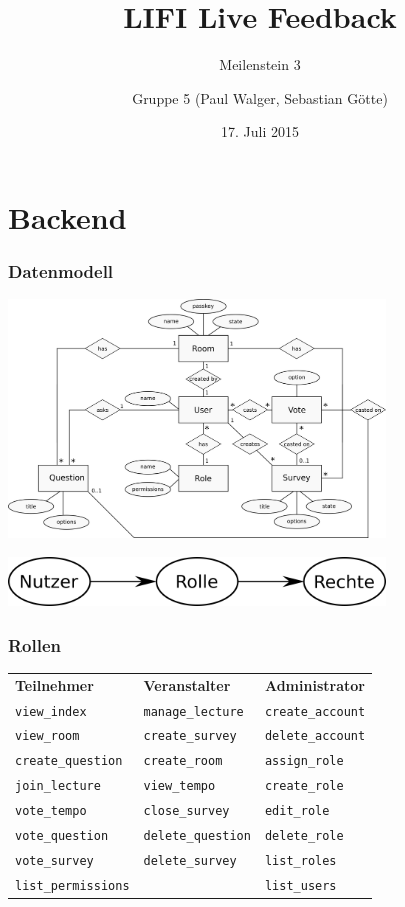 \documentclass{beamer}
\title{LIFI Live Feedback}
\subtitle{Meilenstein 3}
\author{Gruppe 5 (Paul Walger, Sebastian Götte)}
\institute{TU Berlin}
\date{17. Juli 2015}
\begin{document}
\frame{\titlepage}

\section{Backend}
\begin{frame}
    \frametitle{Datenmodell}
    \begin{center}
        \includegraphics[width=10cm]{../MS1/diagrams/er/er_diagram.png}
    \end{center}
\end{frame}
\begin{frame}
    \begin{center}
        \includegraphics[width=10cm]{diagrams/roles-1.png}
    \end{center}
\end{frame}
\begin{frame}
    \frametitle{Rollen}
    \begin{tabular}{lll}
        \textbf{Teilnehmer}&\textbf{Veranstalter}&\textbf{Administrator}\\
        \texttt{view\_index}&       \texttt{manage\_lecture}&  \texttt{create\_account}\\
        \texttt{view\_room}&        \texttt{create\_survey}&   \texttt{delete\_account}\\
        \texttt{create\_question}&  \texttt{create\_room}&     \texttt{assign\_role}\\
        \texttt{join\_lecture}&     \texttt{view\_tempo}&      \texttt{create\_role}\\
        \texttt{vote\_tempo}&       \texttt{close\_survey}&    \texttt{edit\_role}\\
        \texttt{vote\_question}&    \texttt{delete\_question}& \texttt{delete\_role}\\
        \texttt{vote\_survey}&      \texttt{delete\_survey}&   \texttt{list\_roles}\\
        \texttt{list\_permissions}& \texttt{}&                 \texttt{list\_users}
    \end{tabular}
\end{frame}
\end{document}
